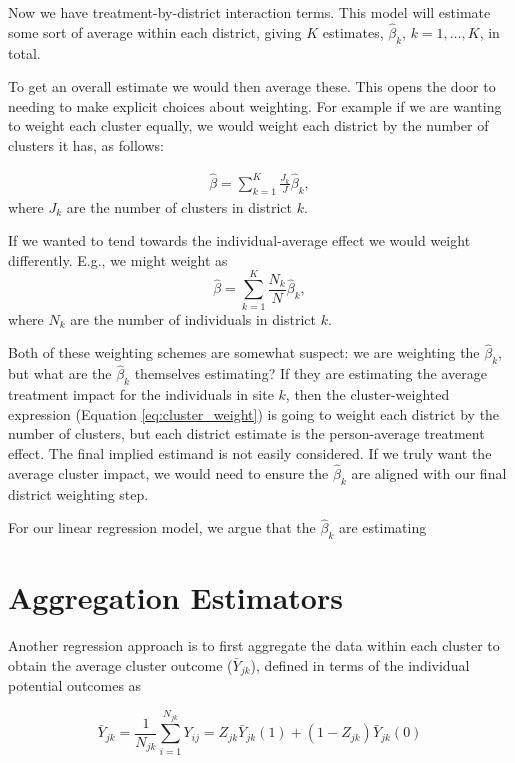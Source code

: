 \documentclass[]{article}
\begin{document}
Now we have treatment-by-district interaction terms. This model will
estimate some sort of average within each district, giving $K$
estimates, $\hat{\beta}_k$, $k=1,\ldots,K$, in total.

To get an overall estimate we would then average these. This opens the
door to needing to make explicit choices about weighting. For example if
we are wanting to weight each cluster equally, we would weight each
district by the number of clusters it has, as follows:

\begin{align}
\hat{\beta} = \sum_{k=1}^K \frac{J_k}{J} \hat{\beta}_{k}, \label{eq:cluster_weight}
\end{align}
where $J_k$ are the number of clusters in district $k$.

If we wanted to tend towards the individual-average effect we would weight differently. E.g., we might weight as
\[
\hat{\beta} = \sum_{k=1}^K \frac{N_k}{N} \hat{\beta}_{k} ,
\] where $N_k$ are the number of individuals in district $k$.

Both of these weighting schemes are somewhat suspect: we are weighting the $\hat{\beta}_k$, but what are the $\hat{\beta}_k$ themselves estimating?
If they are estimating the average treatment impact for the individuals in site $k$, then the cluster-weighted expression (Equation \ref{eq:cluster_weight}) is going to weight each district by the number of clusters, but each district estimate is the person-average treatment effect.
The final implied estimand is not easily considered.
If we truly want the average cluster impact, we would need to ensure the $\hat{\beta}_k$ are aligned with our final district weighting step.


For our linear regression model, we argue that the $\hat{\beta}_k$ are estimating 




\section{Aggregation Estimators}\label{aggregation-estimators}

Another regression approach is to first aggregate the data within each
cluster to obtain the average cluster outcome ($\bar{Y}_{jk}$),
defined in terms of the individual potential outcomes as

\[ \bar{Y}_{jk} = \frac{1}{N_{jk}}  \sum_{i=1}^{N_{jk}} Y_{ij} = Z_{jk} \bar{Y}_{jk}(1) + (1-Z_{jk})\bar{Y}_{jk}(0) \]
\end{document}
